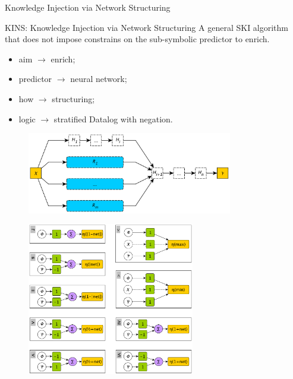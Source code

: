 \documentclass[presentation]{beamer}\mode<presentation>{\usetheme{AMSBolognaFC}}
\begin{document}
\begin{frame}[allowframebreaks]{Knowledge Injection via Network Structuring}
    
    \begin{block}{KINS: Knowledge Injection via Network Structuring}
        A general SKI algorithm that does not impose constrains on the sub-symbolic predictor to enrich.
        \begin{itemize}
            \item aim $\rightarrow$ enrich;
            \item predictor $\rightarrow$ neural network;
            \item how $\rightarrow$ structuring;
            \item logic $\rightarrow$ stratified Datalog with negation.
        \end{itemize}        
    \end{block}
    
    \framebreak
    
    \begin{figure}
        \centering
        \includegraphics[width=0.8\textwidth]{figures/kins-architecture}
    \end{figure}
    
    \framebreak
    
    
    
    \framebreak
    
    \begin{figure}
        \centering
        \includegraphics[width=0.65\textwidth]{figures/neurons}
    \end{figure}
    
\end{frame}
\end{document}
